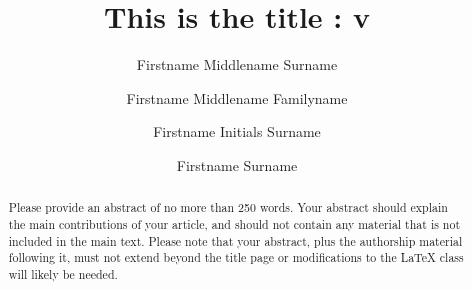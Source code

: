 \documentclass[9pt,bestpractices]{livecoms}
\title{This is the title : v\versionnumber}
\author[1*]{Firstname Middlename Surname}
\author[1,2\authfn{1}\authfn{3}]{Firstname Middlename Familyname}
\author[2\authfn{1}\authfn{4}]{Firstname Initials Surname}
\author[2*]{Firstname Surname}
\affil[1]{Institution 1}
\affil[2]{Institution 2}
\begin{document}
\begin{frontmatter}
\maketitle

\begin{abstract}
Please provide an abstract of no more than 250 words. Your abstract should explain the main contributions of your article, and should not contain any material that is not included in the main text.
Please note that your abstract, plus the authorship material following it, must not extend beyond the title page or modifications to the LaTeX class will likely be needed.
\end{abstract}

\end{frontmatter}
\end{document}
